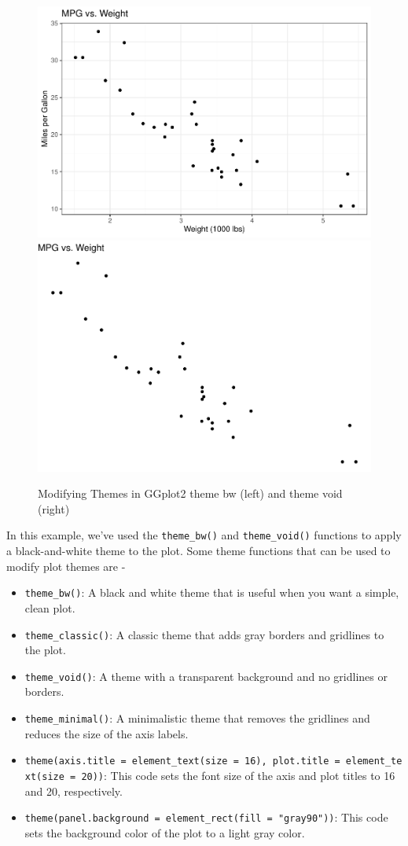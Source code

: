 \documentclass[
]{book}
\providecommand{\tightlist}{%
  \setlength{\itemsep}{0pt}\setlength{\parskip}{0pt}}
\begin{document}
\begin{figure}

{\centering \includegraphics[width=0.49\linewidth]{DauR_files/figure-latex/theme1-1} \includegraphics[width=0.49\linewidth]{DauR_files/figure-latex/theme1-2} 

}

\caption{Modifying Themes in GGplot2 theme bw (left) and theme void (right)}\label{fig:theme1}
\end{figure}

In this example, we've used the \texttt{theme\_bw()} and \texttt{theme\_void()} functions to apply a black-and-white theme to the plot. Some theme functions that can be used to modify plot themes are -

\begin{itemize}
\tightlist
\item
  \texttt{theme\_bw()}: A black and white theme that is useful when you want a simple, clean plot.
\item
  \texttt{theme\_classic()}: A classic theme that adds gray borders and gridlines to the plot.
\item
  \texttt{theme\_void()}: A theme with a transparent background and no gridlines or borders.
\item
  \texttt{theme\_minimal()}: A minimalistic theme that removes the gridlines and reduces the size of the axis labels.
\item
  \texttt{theme(axis.title\ =\ element\_text(size\ =\ 16),\ plot.title\ =\ element\_text(size\ =\ 20))}: This code sets the font size of the axis and plot titles to 16 and 20, respectively.
\item
  \texttt{theme(panel.background\ =\ element\_rect(fill\ =\ "gray90"))}: This code sets the background color of the plot to a light gray color.
\end{itemize}
\end{document}
